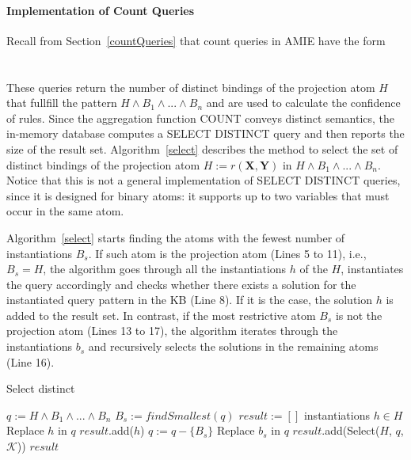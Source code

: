 {\paragraph{Implementation of Count Queries} Recall from Section~\ref{countQueries} that count queries in AMIE have the form \\ \\
 \\

These queries return the number of distinct bindings of the projection atom $H$ 
that fullfill the pattern $H \wedge B_1 \wedge ... \wedge B_n$ and are used to
calculate the confidence of rules. Since the aggregation function COUNT conveys
distinct semantics, the in-memory database computes a SELECT DISTINCT query 
and then reports the size of the result set. Algorithm~\ref{select} describes
the method to select the set of distinct bindings of the projection atom $H := r(\bm{X}, \bm{Y})$ in
$H \wedge B_1 \wedge ... \wedge B_n$. Notice that this is not a general implementation of SELECT DISTINCT queries,
since it is designed for binary atoms: it supports up to two variables that must occur in the same atom.

Algorithm~\ref{select} starts finding the atoms with the fewest number of instantiations $B_s$. If such atom is the
projection atom (Lines 5 to 11), i.e., $B_s = H$, the algorithm goes through all the instantiations $h$ of the $H$, instantiates
the query accordingly and checks whether there exists a solution for the instantiated query pattern in the KB (Line 8). 
If it is the case, the solution $h$ is added to the result set. In contrast, if the most restrictive atom $B_s$ is not 
the projection atom (Lines 13 to 17), the algorithm iterates through the instantiations $b_s$ and recursively 
selects the solutions in the remaining atoms (Line 16).

\begin{algorithm}
\caption{Select distinct}
\label{select}
\begin{algorithmic}[1]
    \State $q := H \wedge B_1 \wedge ... \wedge B_n$
    \State $B_s := findSmallest(q)$
    \State $result := [ ]$
      \ForAll instantiations $h \in H$
	\State Replace $h$ in $q$
	  \State $result$.add($h$)
	\EndIf
      \EndFor
    \Else
      \State $q := q - \{ B_s\}$
      	\State Replace $b_s$ in $q$
      	\State $result$.add(Select($H$, $q$, $\mathcal{K}$))
      \EndFor
    \EndIf
    \State \Return $result$
\EndFunction
\end{algorithmic}
\end{algorithm}

}
